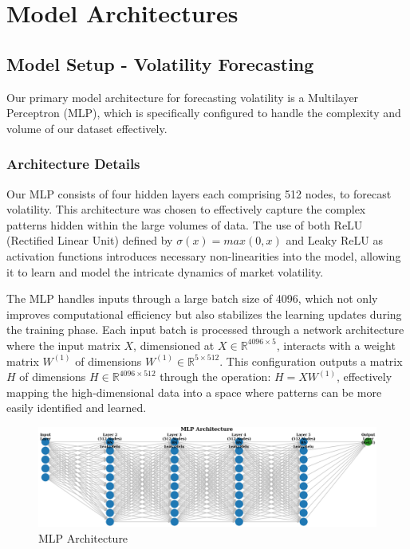 \documentclass[10pt]{article}
\begin{document}
\section{Model Architectures}

\subsection{Model Setup - Volatility Forecasting}
Our primary model architecture for forecasting volatility is a Multilayer Perceptron (MLP), which is specifically configured to handle the complexity and volume of our dataset effectively.

\subsubsection{Architecture Details}

Our MLP consists of four hidden layers each comprising 512 nodes, to forecast volatility. This architecture was chosen to effectively capture the complex patterns hidden within the large volumes of data. The use of both ReLU (Rectified Linear Unit) defined by \(\sigma(x) = max(0,x)\) and Leaky ReLU as activation functions introduces necessary non-linearities into the model, allowing it to learn and model the intricate dynamics of market volatility.

The MLP handles inputs through a large batch size of 4096, which not only improves computational efficiency but also stabilizes the learning updates during the training phase. Each input batch is processed through a network architecture where the input matrix \(X\), dimensioned at \(X \in \mathbb{R}^{4096\times5}\), interacts with a weight matrix \(W^{(1)}\) of dimensions \(W^{(1)} \in \mathbb{R}^{5\times512}\). This configuration outputs a matrix \(H\) of dimensions \(H \in \mathbb{R}^{4096\times512}\) through the operation:
 \(H = XW^{(1)}\), effectively mapping the high-dimensional data into a space where patterns can be more easily identified and learned.

\begin{figure}[H]
    \centering
    \includegraphics[width=0.85\linewidth]{MLP Architecture.png}
    \caption{MLP Architecture}
    \label{fig:enter-label}
\end{figure}
\end{document}
